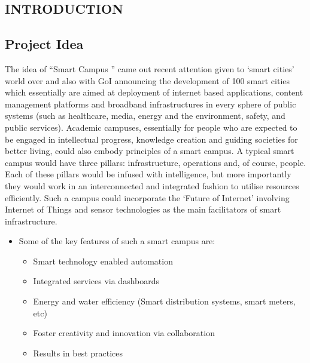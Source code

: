 \documentclass[10pt,a4paper]
{article}
\numberwithin{table}{section}
\begin{document}
{{\begin{normalsize}
\newpage
\begin{center}
\begin{huge}
\section{INTRODUCTION}
\end{huge}
\end{center}
\subsection{Project Idea}
\hspace*{0.3cm}
 The idea of “Smart Campus ” came out recent attention given to ‘smart cities’ world over and also  with  GoI  announcing  the  development  of  100  smart  cities  which  essentially  are  aimed  at deployment  of  internet  based  applications,  content  management  platforms  and  broadband infrastructures  in  every  sphere  of  public  systems  (such  as  healthcare,  media,  energy  and  the environment, safety, and public services). \newline 
Academic campuses, essentially for people who are expected to be engaged in intellectual progress, knowledge creation and guiding societies for better living, could also embody principles of a smart campus. A typical smart campus would have three pillars: infrastructure, operations and, of course, people. Each of these pillars would be infused with intelligence, but  more importantly they would work in an interconnected and integrated fashion to utilise resources efficiently. Such a campus could incorporate the ‘Future of Internet’ involving Internet of Things and sensor technologies as the main facilitators of smart infrastructure.\\
\begin{itemize}
\item Some of the key features of such a smart campus are: 
\begin{itemize}
\item Smart technology enabled automation 
\item  Integrated services via dashboards  
\item  Energy and water efficiency (Smart distribution systems, smart meters, etc) 
\item  Foster creativity and innovation via collaboration 
\item  Results in best practices 
\end{itemize}
\end{itemize}


\end{normalsize}}}
\end{document}

